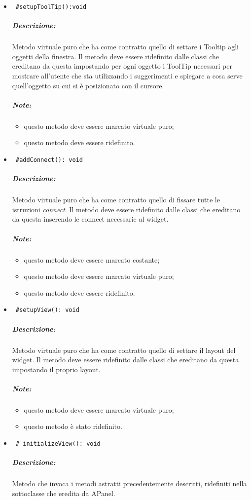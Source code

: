 \begin{itemize}
\item \color{blue}\verb! #setupToolTip():void!
\color{black} 
\subparagraph{Descrizione: }Metodo virtuale puro che ha come contratto quello di settare i Tooltip\g{} agli oggetti della finestra. Il metodo deve essere ridefinito dalle classi che ereditano da questa impostando per ogni oggetto i ToolTip necessari per mostrare all'utente che sta utilizzando \project{} i suggerimenti e  spiegare a cosa serve quell'oggetto su cui si è posizionato con il cursore. \\
 \subparagraph{Note:}
 \begin{itemize}
 \item questo metodo deve essere marcato virtuale puro;
 \item questo metodo deve essere ridefinito.
 \end{itemize}
\item \color{blue}\verb! #addConnect(): void!
\color{black} 
\subparagraph{Descrizione:} Metodo virtuale puro che ha come contratto quello di fissare tutte le istruzioni \emph{connect}. Il metodo deve essere ridefinito dalle classi che ereditano da questa inserendo le connect necessarie al widget.\\ 
 \subparagraph{Note:}
 \begin{itemize}
 \item questo metodo deve essere marcato costante;
 \item questo metodo deve essere marcato virtuale puro;
 \item questo metodo deve essere ridefinito.
 \end{itemize}

\item \color{blue}\verb! #setupView(): void !
\color{black} 
\subparagraph{Descrizione: } Metodo virtuale puro che ha come contratto quello di settare il layout del widget. Il metodo deve essere ridefinito dalle classi che ereditano da questa impostando il proprio layout.\\
 \subparagraph{Note:}
 \begin{itemize}
 \item questo metodo deve essere marcato virtuale puro;
 \item questo metodo è stato ridefinito.
 \end{itemize}
 

\item \color{blue}\verb! # initializeView(): void !
\color{black} 
\subparagraph{Descrizione: }
Metodo che invoca i metodi astratti precedentemente descritti, ridefiniti nella sottoclasse che eredita da APanel.


\end{itemize}

